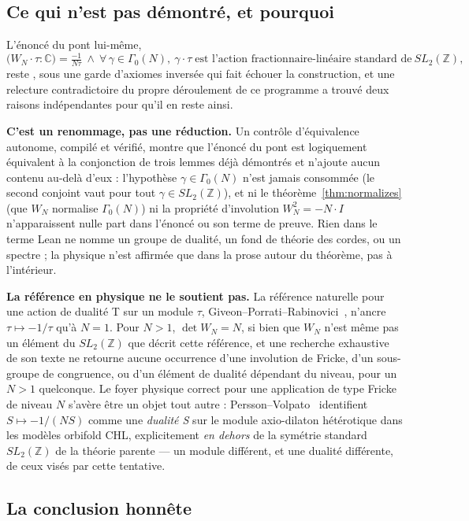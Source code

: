 \documentclass[11pt, a4paper]{article}
\newcommand{\lean}[1]{\ifmmode\text{\ttfamily\detokenize{#1}}\else{\ttfamily\detokenize{#1}}\fi}
\theoremstyle{remark}
\begin{document}
\subsection*{Ce qui n'est pas démontré, et pourquoi}

L'énoncé du pont lui-même,
\[
  \bigl(W_N \cdot \tau : \mathbb{C}\bigr) = \tfrac{-1}{N\tau}
  \ \wedge\ \forall\,\gamma\in\Gamma_0(N),\ \gamma\cdot\tau
    \;\text{est l'action fractionnaire-linéaire standard de}\ SL_2(\mathbb{Z}),
\]
reste \lean{sorry}, sous une garde d'axiomes inversée qui fait échouer la construction, et une
relecture contradictoire du propre déroulement de ce programme a trouvé deux raisons indépendantes
pour qu'il en reste ainsi.

\textbf{C'est un renommage, pas une réduction.} Un contrôle d'équivalence autonome, compilé et
vérifié, montre que l'énoncé du pont est logiquement équivalent à la conjonction de trois lemmes
déjà démontrés et n'ajoute aucun contenu au-delà d'eux : l'hypothèse $\gamma\in\Gamma_0(N)$ n'est
jamais consommée (le second conjoint vaut pour tout $\gamma\in SL_2(\mathbb{Z})$), et ni le
théorème~\ref{thm:normalizes} (que $W_N$ normalise $\Gamma_0(N)$) ni la propriété d'involution
$W_N^2=-N\cdot I$ n'apparaissent nulle part dans l'énoncé ou son terme de preuve. Rien dans le terme
Lean ne nomme un groupe de dualité, un fond de théorie des cordes, ou un spectre ; la physique n'est
affirmée que dans la prose autour du théorème, pas à l'intérieur.

\textbf{La référence en physique ne le soutient pas.} La référence naturelle pour une action de
dualité T sur un module $\tau$, Giveon--Porrati--Rabinovici~\cite{GPR1994}, n'ancre
$\tau\mapsto-1/\tau$ qu'à $N=1$. Pour $N>1$, $\det W_N = N$, si bien que $W_N$ n'est même pas un
élément du $SL_2(\mathbb{Z})$ que décrit cette référence, et une recherche exhaustive de son texte
ne retourne aucune occurrence d'une involution de Fricke, d'un sous-groupe de congruence, ou d'un
élément de dualité dépendant du niveau, pour un $N>1$ quelconque. Le foyer physique correct pour une
application de type Fricke de niveau $N$ s'avère être un objet tout autre :
Persson--Volpato~\cite{PerssonVolpato2015} identifient $S\mapsto -1/(NS)$ comme une
\emph{dualité S} sur le module axio-dilaton hétérotique dans les modèles orbifold CHL,
explicitement \emph{en dehors} de la symétrie standard $SL_2(\mathbb{Z})$ de la théorie parente ---
un module différent, et une dualité différente, de ceux visés par cette tentative.

\subsection*{La conclusion honnête}
\end{document}
